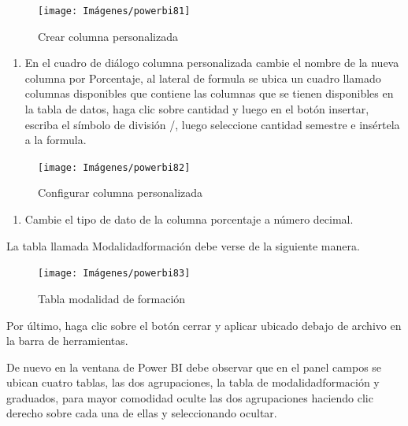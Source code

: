 \documentclass[
]{book}
\providecommand{\tightlist}{%
  \setlength{\itemsep}{0pt}\setlength{\parskip}{0pt}}
\begin{document}
\begin{figure}

{\centering \texttt{[image: Imágenes/powerbi81]} 

}

\caption{Crear columna personalizada}\label{fig:paso12porcentajes-fig}
\end{figure}

\begin{enumerate}
\def\labelenumi{\arabic{enumi}.}
\setcounter{enumi}{12}
\tightlist
\item
  En el cuadro de diálogo columna personalizada cambie el nombre de la nueva columna por Porcentaje, al lateral de formula se ubica un cuadro llamado columnas disponibles que contiene las columnas que se tienen disponibles en la tabla de datos, haga clic sobre cantidad y luego en el botón insertar, escriba el símbolo de división /, luego seleccione cantidad semestre e insértela a la formula.
\end{enumerate}

\begin{figure}

{\centering \texttt{[image: Imágenes/powerbi82]} 

}

\caption{Configurar columna personalizada}\label{fig:paso13porcentajes-fig}
\end{figure}

\begin{enumerate}
\def\labelenumi{\arabic{enumi}.}
\setcounter{enumi}{13}
\tightlist
\item
  Cambie el tipo de dato de la columna porcentaje a número decimal.
\end{enumerate}

La tabla llamada Modalidadformación debe verse de la siguiente manera.

\begin{figure}

{\centering \texttt{[image: Imágenes/powerbi83]} 

}

\caption{Tabla modalidad de formación}\label{fig:tablamodalidadformacion-fig}
\end{figure}

Por último, haga clic sobre el botón cerrar y aplicar ubicado debajo de archivo en la barra de herramientas.

De nuevo en la ventana de Power BI debe observar que en el panel campos se ubican cuatro tablas, las dos agrupaciones, la tabla de modalidadformación y graduados, para mayor comodidad oculte las dos agrupaciones haciendo clic derecho sobre cada una de ellas y seleccionando ocultar.
\end{document}

